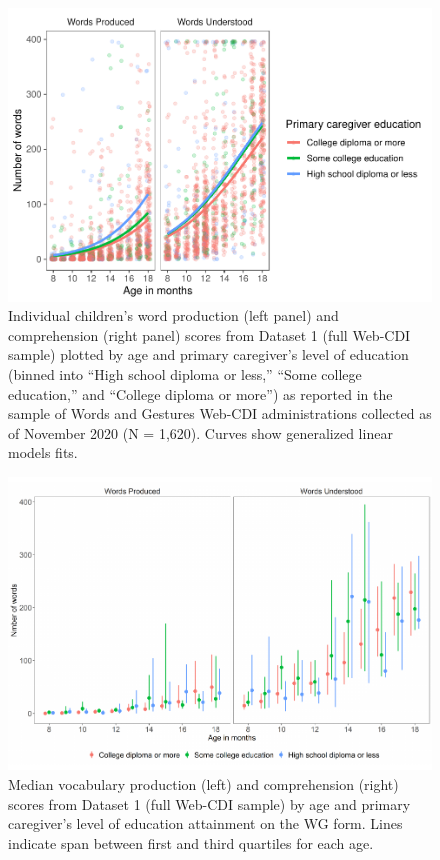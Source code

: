 \documentclass[
  english,
  ,man,floatsintext]{apa6}
\begin{document}
\begin{figure}
\centering
\includegraphics{webcdi_paper_files/figure-latex/wgglm-1.pdf}
\caption{\label{fig:wgglm}Individual children's word production (left panel) and comprehension (right panel) scores from Dataset 1 (full Web-CDI sample) plotted by age and primary caregiver's level of education (binned into ``High school diploma or less,'' ``Some college education,'' and ``College diploma or more'') as reported in the sample of Words and Gestures Web-CDI administrations collected as of November 2020 (N = 1,620). Curves show generalized linear models fits.}
\end{figure}

\begin{figure}
\centering
\includegraphics{webcdi_paper_files/figure-latex/wgmedfig-1.pdf}
\caption{\label{fig:wgmedfig}Median vocabulary production (left) and comprehension (right) scores from Dataset 1 (full Web-CDI sample) by age and primary caregiver's level of education attainment on the WG form. Lines indicate span between first and third quartiles for each age.}
\end{figure}
\end{document}
